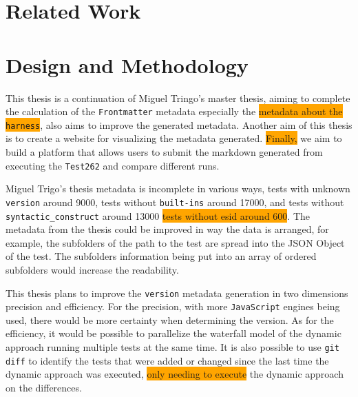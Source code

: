 \documentclass[runningheads]{llncs}
\begin{document}
\section{Related Work}
\label{sec:Related Work}



\section{Design and Methodology}
\label{sec:Design and Methodology}



This thesis is a continuation of Miguel Tringo's master thesis, aiming to complete the calculation of the \texttt{Frontmatter} metadata especially the \colorbox{orange}{metadata about the \texttt{harness}}, also aims to improve the generated metadata. Another aim of this thesis is to create a website for visualizing the metadata generated. \colorbox{orange}{Finally,} we aim to build a platform that allows users to submit the markdown generated from executing the \texttt{Test262} and compare different runs.



Miguel Trigo's thesis metadata is incomplete in various ways, tests with unknown \texttt{version} around 9000, tests without \texttt{built-ins} around 17000, and tests without \texttt{syntactic\_construct} around 13000 \colorbox{orange}{tests without esid around 600}.
%
The metadata from the thesis could be improved in way the data is arranged, for example, the subfolders of the path to the test are spread into the JSON Object of the test. The subfolders information being put into an array of ordered subfolders would increase the readability.



This thesis plans to improve the \texttt{version} metadata generation in two dimensions precision and efficiency.
For the precision, with more \texttt{JavaScript} engines being used, there would be more certainty when determining the version.
As for the efficiency, it would be possible to parallelize the waterfall model of the dynamic approach running multiple tests at the same time. It is also possible to use \texttt{git diff} to identify the tests that were added or changed since the last time the dynamic approach was executed, \colorbox{orange}{ only needing to execute} the dynamic approach on the differences.
\end{document}
